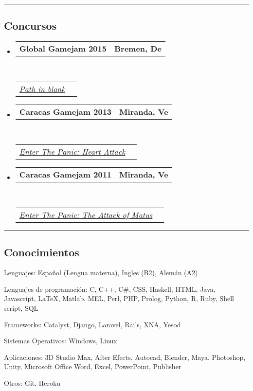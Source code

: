 \documentclass[10pt,letterpaper]{article}
\makeatletter
\newenvironment{indentsection}[1]%
{\begin{list}{}%
	{\setlength{\leftmargin}{#1}}%
	\item[]%
}
{\end{list}}
\newcommand{\headerrow}[2]
{\begin{tabular*}{\linewidth}{l@{\extracolsep{\fill}}r}
	#1 &
	#2 \\
\end{tabular*}}
\makeatother
\begin{document}


\hrule
\vspace{-0.4em}
\subsection*{Concursos}

\begin{itemize}
	\parskip=0.1em
\item 
   \headerrow
   {\textbf{Global Gamejam 2015}}
   {\textbf{Bremen, De}}
  \\
  \headerrow
   {\emph{\href{http://globalgamejam.org/2015/games/path-blank}{Path in blank}}}{}
\item 
   \headerrow
   {\textbf{Caracas Gamejam 2013}}
   {\textbf{Miranda, Ve}}
	\\
	\headerrow
   {\emph{\href{http://globalgamejam.org/2013/enter-panic-heart-attack}{Enter The Panic: Heart Attack}}}{}
\item 
   \headerrow
   {\textbf{Caracas Gamejam 2011}}
   {\textbf{Miranda, Ve}}
	\\
	\headerrow
   {\emph{\href{http://archive.globalgamejam.org/2011/enter-panic-attack-matus}{Enter The Panic: The Attack of Matus}}}{}
\end{itemize}


\hrule
\vspace{-0.4em}
\subsection*{Conocimientos}

\begin{indentsection}{\parindent}
\begin{description*}
	
\item[Lenguajes:]
  Español (Lengua materna), Ingles (B2), Alemán (A2)
\item[Lenguajes de programación:]
  C, C++, C\#, CSS, Haskell, HTML, Java, Javascript, \LaTeX, Matlab, MEL, Perl, PHP, Prolog, Python, R, Ruby, Shell script, SQL
\item[Frameworks:]
  Catalyst, Django, Laravel, Rails, XNA, Yesod
\item[Sistemas Operativos:]
  Windows, Linux
\item[Aplicaciones:]
  3D Studio Max, After Efects, Autocad, Blender, Maya, Photoshop, Unity, Microsoft Office Word, Excel, PowerPoint, Publisher
\item[Otros:]
  Git, Heroku
  
\end{description*}
\end{indentsection}
\end{document}
